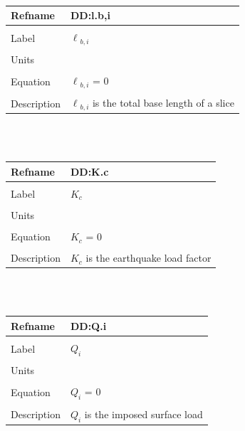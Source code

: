 \documentclass[12pt]{article}
\begin{document}
~\newline
\noindent \begin{minipage}{\textwidth}
\begin{tabular}{p{} p{}}
\toprule \textbf{Refname} & \textbf{DD:l.b,i}
\label{DD:l.b,i}
\\ \midrule \\
Label & $\ell{}_{b,i}$
\\ \midrule \\
Units & 
\\ \midrule \\
Equation & $\ell{}_{b,i}$ = $0$
\\ \midrule \\
Description & $\ell{}_{b,i}$ is the total base length of a slice
\\ \bottomrule \end{tabular}
\end{minipage}\\
~\newline
\noindent \begin{minipage}{\textwidth}
\begin{tabular}{p{} p{}}
\toprule \textbf{Refname} & \textbf{DD:K.c}
\label{DD:K.c}
\\ \midrule \\
Label & $K_{c}$
\\ \midrule \\
Units & 
\\ \midrule \\
Equation & $K_{c}$ = $0$
\\ \midrule \\
Description & $K_{c}$ is the earthquake load factor
\\ \bottomrule \end{tabular}
\end{minipage}\\
~\newline
\noindent \begin{minipage}{\textwidth}
\begin{tabular}{p{} p{}}
\toprule \textbf{Refname} & \textbf{DD:Q.i}
\label{DD:Q.i}
\\ \midrule \\
Label & $Q_{i}$
\\ \midrule \\
Units & 
\\ \midrule \\
Equation & $Q_{i}$ = $0$
\\ \midrule \\
Description & $Q_{i}$ is the imposed surface load
\\ \bottomrule \end{tabular}
\end{minipage}\\
\end{document}
